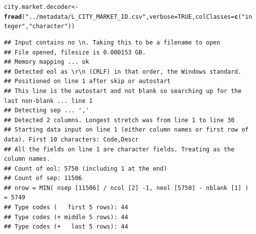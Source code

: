 \documentclass{scrreprt}\usepackage[]{graphicx}\usepackage[]{color}
\makeatletter
\newcommand{\hlnum}[1]{\textcolor[rgb]{0.686,0.059,0.569}{#1}}%
\newcommand{\hlstr}[1]{\textcolor[rgb]{0.192,0.494,0.8}{#1}}%
\newcommand{\hlstd}[1]{\textcolor[rgb]{0.345,0.345,0.345}{#1}}%
\newcommand{\hlkwb}[1]{\textcolor[rgb]{0.69,0.353,0.396}{#1}}%
\newcommand{\hlkwc}[1]{\textcolor[rgb]{0.333,0.667,0.333}{#1}}%
\newcommand{\hlkwd}[1]{\textcolor[rgb]{0.737,0.353,0.396}{\textbf{#1}}}%
\newenvironment{kframe}{%
 \def\at@end@of@kframe{}%
 \ifinner\ifhmode%
  \def\at@end@of@kframe{\end{minipage}}%
  \begin{minipage}{\columnwidth}%
 \fi\fi%
 \def\FrameCommand##1{\hskip\@totalleftmargin \hskip-\fboxsep
 \colorbox{shadecolor}{##1}\hskip-\fboxsep
     \hskip-\linewidth \hskip-\@totalleftmargin \hskip\columnwidth}%
 \MakeFramed {\advance\hsize-\width
   \@totalleftmargin\z@ \linewidth\hsize
   \@setminipage}}%
 {\par\unskip\endMakeFramed%
 \at@end@of@kframe}
\newenvironment{knitrout}{}{} %
\makeatother
\begin{document}
\begin{knitrout}
\color{fgcolor}\begin{kframe}
\begin{alltt}
\hlstd{city.market.decoder} \hlkwb{<-} \hlkwd{fread}\hlstd{(}\hlstr{"../metadata/L_CITY_MARKET_ID.csv"}\hlstd{,} \hlkwc{verbose} \hlstd{=} \hlnum{TRUE}\hlstd{,} \hlkwc{colClasses} \hlstd{=} \hlkwd{c}\hlstd{(}\hlstr{"integer"}\hlstd{,} \hlstr{"character"}\hlstd{))}
\end{alltt}
\begin{verbatim}
## Input contains no \n. Taking this to be a filename to open
## File opened, filesize is 0.000153 GB.
## Memory mapping ... ok
## Detected eol as \r\n (CRLF) in that order, the Windows standard.
## Positioned on line 1 after skip or autostart
## This line is the autostart and not blank so searching up for the last non-blank ... line 1
## Detecting sep ... ','
## Detected 2 columns. Longest stretch was from line 1 to line 30
## Starting data input on line 1 (either column names or first row of data). First 10 characters: Code,Descr
## All the fields on line 1 are character fields. Treating as the column names.
## Count of eol: 5750 (including 1 at the end)
## Count of sep: 11506
## nrow = MIN( nsep [11506] / ncol [2] -1, neol [5750] - nblank [1] ) = 5749
## Type codes (   first 5 rows): 44
## Type codes (+ middle 5 rows): 44
## Type codes (+   last 5 rows): 44
\end{verbatim}



\end{kframe}
\end{knitrout}
\end{document}
